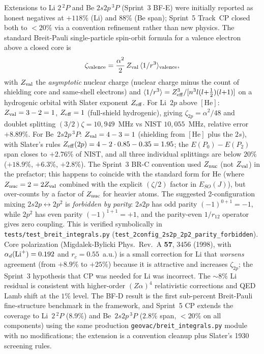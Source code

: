 \documentclass[aps,pra,twocolumn,superscriptaddress,longbibliography]{revtex4-2}
\begin{document}
Extensions to Li $2\,^2\!P$ and Be $2s2p\,^3\!P$ (Sprint~3 BF-E)
were initially reported as honest negatives at $+118\%$ (Li) and $88\%$
(Be span); Sprint~5 Track~CP closed both to $<20\%$ via a convention
refinement rather than new physics.  The standard
Breit-Pauli single-particle spin-orbit formula for a valence electron
above a closed core is
\begin{equation}\label{eq:zeta_std}
  \zeta_{\rm valence} = \frac{\alpha^{2}}{2}\,Z_{\rm val}\,
                          \langle 1/r^{3} \rangle_{\rm valence},
\end{equation}
with $Z_{\rm val}$ the \emph{asymptotic} nuclear charge (nuclear charge
minus the count of shielding core and same-shell electrons) and
$\langle 1/r^{3} \rangle = Z_{\rm eff}^{3}/[n^{3}l(l{+}\tfrac{1}{2})(l{+}1)]$
on a hydrogenic orbital with Slater exponent $Z_{\rm eff}$.
For Li~$2p$ above $[\mathrm{He}]$: $Z_{\rm val} = 3 - 2 = 1$,
$Z_{\rm eff} = 1$ (full-shield hydrogenic), giving
$\zeta_{2p} = \alpha^{2}/48$ and doublet splitting
$(3/2)\zeta = 10{,}949$~MHz vs NIST $10{,}055$~MHz, relative error
$+8.89\%$.  For Be~$2s2p\,^3\!P$: $Z_{\rm val} = 4 - 3 = 1$
(shielding from $[\mathrm{He}]$ plus the $2s$), with Slater's rules
$Z_{\rm eff}(2p) = 4 - 2\cdot 0.85 - 0.35 = 1.95$; the
$E(P_{0}){-}E(P_{2})$ span closes to $+2.76\%$ of NIST, and all
three individual splittings are below $20\%$ ($+18.9\%$, $+6.3\%$,
$+2.8\%$).  The Sprint~3 BR-C convention used
$Z_{\rm nuc}$ (not $Z_{\rm val}$) in the prefactor;
this happens to coincide with the standard form for He
(where $Z_{\rm nuc} = 2 = 2Z_{\rm val}$ combined with the explicit
$(\zeta/2)$ factor in $E_{SO}(J)$), but over-counts by a factor
of $Z_{\rm nuc}$ for heavier atoms.
The suggested 2-configuration mixing $2s2p \leftrightarrow 2p^{2}$
is \emph{forbidden by parity}: $2s2p$ has odd parity $(-1)^{0+1} = -1$,
while $2p^{2}$ has even parity $(-1)^{1+1} = +1$, and the
parity-even $1/r_{12}$ operator gives zero coupling.  This is verified
symbolically in \texttt{tests/test\_breit\_integrals.py}
(\texttt{test\_2config\_2s2p\_2p2\_parity\_forbidden}).
Core polarization (Migdalek-Bylicki
Phys.~Rev.~A \textbf{57}, 3456 (1998), with $\alpha_{d}({\rm Li}^{+}) = 0.192$
and $r_{c} = 0.55$~a.u.) is a small correction for Li that
\emph{worsens} agreement (from $+8.9\%$ to $+25\%$) because it is
attractive and increases $\zeta_{2p}$; the Sprint~3 hypothesis that CP
was needed for Li was incorrect.  The $\sim 8\%$ Li residual is
consistent with higher-order $(Z\alpha)^{4}$ relativistic corrections
and QED Lamb shift at the $1\%$ level.
The BF-D result is the first sub-percent Breit-Pauli fine-structure
benchmark in the framework, and Sprint~5 CP extends the coverage to
Li~$2\,^2\!P$ ($8.9\%$) and Be~$2s2p\,^3\!P$ ($2.8\%$ span, $<20\%$
on all components) using the same production
\texttt{geovac/breit\_integrals.py} module with no modifications;
the extension is a convention cleanup plus Slater's 1930 screening rules.
\end{document}
